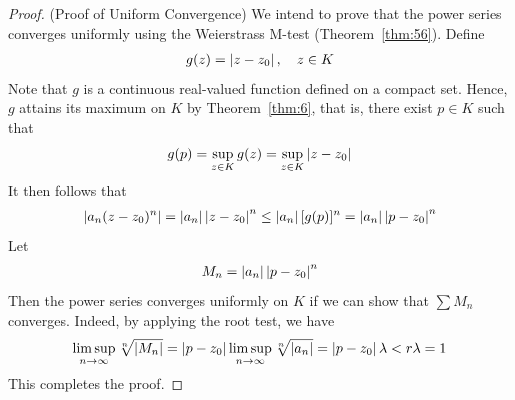 \documentclass[thmcnt=section, 12pt]{my-elegantbook}
\begin{document}
\begin{proof}
    (Proof of Uniform Convergence) We intend to prove that the power series converges uniformly using the Weierstrass M-test (Theorem~\ref{thm:56}). Define
    \begin{align*}
        g(z) = \left\lvert z - z_0 \right\rvert,
        \quad z \in K
    \end{align*}
    Note that $g$ is a continuous real-valued function defined on a compact set. Hence, $g$ attains its maximum on $K$ by Theorem~\ref{thm:6}, that is, there exist $p \in K$ such that 
    \begin{align*}
        g(p) = \sup_{z \in K} g(z)
        = \sup_{z \in K} \left\lvert z - z_0 \right\rvert
    \end{align*}
    It then follows that 
    \begin{align*}
        \left\lvert a_n (z - z_0)^n \right\rvert
        = \left\lvert a_n \right\rvert \left\lvert z - z_0 \right\rvert^n
        \leq \left\lvert a_n \right\rvert [g(p)]^n
        = \left\lvert a_n \right\rvert \left\lvert p - z_0 \right\rvert^n
    \end{align*}
    Let 
    \begin{align*}
        M_n = \left\lvert a_n \right\rvert \left\lvert p - z_0 \right\rvert^n
    \end{align*}
    Then the power series converges uniformly on $K$ if we can show that $\sum M_n$ converges. Indeed, by applying the root test, we have 
    \begin{align*}
        \limsup_{n \to \infty} \sqrt[n]{\left\lvert M_n \right\rvert}
        = \left\lvert p - z_0 \right\rvert \limsup_{n \to \infty} \sqrt[n]{\left\lvert a_n \right\rvert}
        = \left\lvert p - z_0 \right\rvert \lambda
        < r \lambda
        = 1
    \end{align*}
    This completes the proof.
\end{proof}


\printbibliography[heading=bibintoc, title=References]


\printindex

\end{document}
